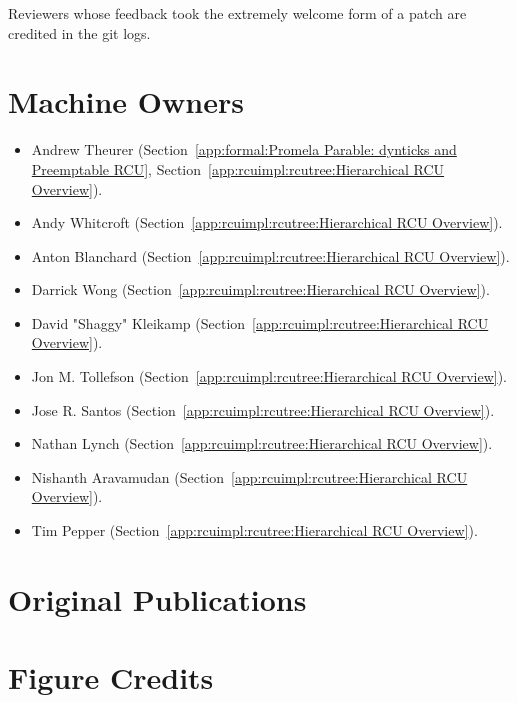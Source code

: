 Reviewers whose feedback took the extremely welcome form of a patch
are credited in the git logs.

\section{Machine Owners}

\begin{itemize}
\item	Andrew Theurer
	(Section~\ref{app:formal:Promela Parable: dynticks and Preemptable RCU},
	Section~\ref{app:rcuimpl:rcutree:Hierarchical RCU Overview}).
\item	Andy Whitcroft (Section~\ref{app:rcuimpl:rcutree:Hierarchical RCU Overview}).
\item	Anton Blanchard (Section~\ref{app:rcuimpl:rcutree:Hierarchical RCU Overview}).
\item	Darrick Wong (Section~\ref{app:rcuimpl:rcutree:Hierarchical RCU Overview}).
\item	David "Shaggy" Kleikamp (Section~\ref{app:rcuimpl:rcutree:Hierarchical RCU Overview}).
\item	Jon M. Tollefson (Section~\ref{app:rcuimpl:rcutree:Hierarchical RCU Overview}).
\item	Jose R. Santos (Section~\ref{app:rcuimpl:rcutree:Hierarchical RCU Overview}).
\item	Nathan Lynch (Section~\ref{app:rcuimpl:rcutree:Hierarchical RCU Overview}).
\item	Nishanth Aravamudan (Section~\ref{app:rcuimpl:rcutree:Hierarchical RCU Overview}).
\item	Tim Pepper (Section~\ref{app:rcuimpl:rcutree:Hierarchical RCU Overview}).
\end{itemize}

\section{Original Publications}

\ListOriginalPublications

\section{Figure Credits}

\ListContributions
